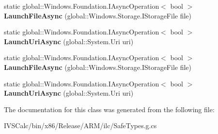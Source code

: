 \begin{DoxyCompactItemize}
static global\+::\+Windows.\+Foundation.\+I\+Async\+Operation$<$ bool $>$ {\bfseries Launch\+File\+Async} (global\+::\+Windows.\+Storage.\+I\+Storage\+File file)
\item 
\mbox{\label{class_windows_1_1_system_1_1_launcher_ac4df25b2ed71d3f99b6202d36e78bbcd}} 
static global\+::\+Windows.\+Foundation.\+I\+Async\+Operation$<$ bool $>$ {\bfseries Launch\+Uri\+Async} (global\+::\+System.\+Uri uri)
\item 
\mbox{\label{class_windows_1_1_system_1_1_launcher_afc03eb992a1f6a4ff9af2bf7eef6445f}} 
static global\+::\+Windows.\+Foundation.\+I\+Async\+Operation$<$ bool $>$ {\bfseries Launch\+File\+Async} (global\+::\+Windows.\+Storage.\+I\+Storage\+File file)
\item 
\mbox{\label{class_windows_1_1_system_1_1_launcher_ac4df25b2ed71d3f99b6202d36e78bbcd}} 
static global\+::\+Windows.\+Foundation.\+I\+Async\+Operation$<$ bool $>$ {\bfseries Launch\+Uri\+Async} (global\+::\+System.\+Uri uri)
\end{DoxyCompactItemize}


The documentation for this class was generated from the following file\+:\begin{DoxyCompactItemize}
\item 
I\+V\+S\+Calc/bin/x86/\+Release/\+A\+R\+M/ilc/Safe\+Types.\+g.\+cs\end{DoxyCompactItemize}
